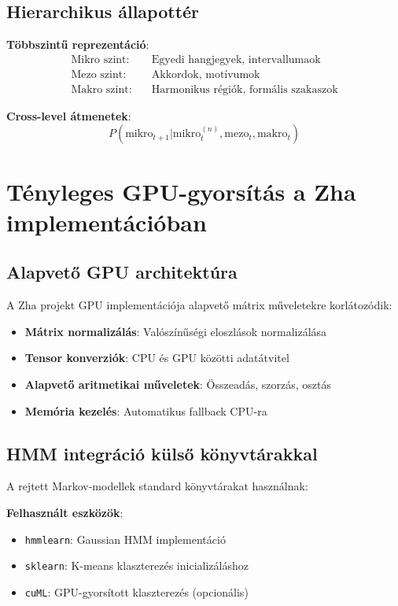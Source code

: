 \subsection{Hierarchikus állapottér}

\textbf{Többszintű reprezentáció}:
\begin{align}
\text{Mikro szint:} &\quad \text{Egyedi hangjegyek, intervallumaok} \\
\text{Mezo szint:} &\quad \text{Akkordok, motívumok} \\
\text{Makro szint:} &\quad \text{Harmonikus régiók, formális szakaszok}
\end{align}

\textbf{Cross-level átmenetek}:
\begin{equation}
P(\text{mikro}_{t+1} | \text{mikro}_t^{(n)}, \text{mezo}_t, \text{makro}_t)
\end{equation}

\section{Tényleges GPU-gyorsítás a Zha implementációban}

\subsection{Alapvető GPU architektúra}

A Zha projekt GPU implementációja alapvető mátrix műveletekre korlátozódik:

\begin{itemize}
    \item \textbf{Mátrix normalizálás}: Valószínűségi eloszlások normalizálása
    \item \textbf{Tensor konverziók}: CPU és GPU közötti adatátvitel
    \item \textbf{Alapvető aritmetikai műveletek}: Összeadás, szorzás, osztás
    \item \textbf{Memória kezelés}: Automatikus fallback CPU-ra
\end{itemize}

\subsection{HMM integráció külső könyvtárakkal}

A rejtett Markov-modellek standard könyvtárakat használnak:

\textbf{Felhasznált eszközök}:
\begin{itemize}
    \item \texttt{hmmlearn}: Gaussian HMM implementáció
    \item \texttt{sklearn}: K-means klaszterezés inicializáláshoz
    \item \texttt{cuML}: GPU-gyorsított klaszterezés (opcionális)
\end{itemize}

